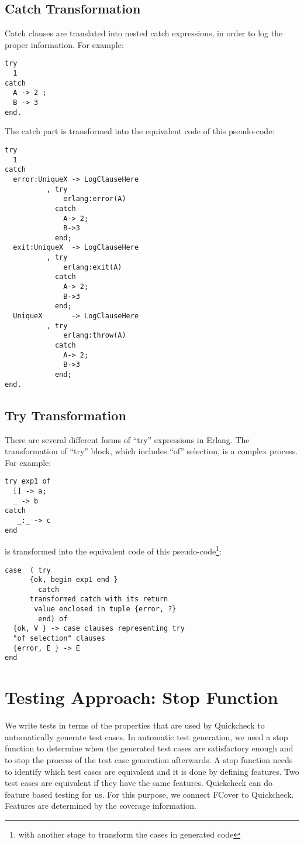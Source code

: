 \documentclass[12pt,a4paper]{report}
\begin{document}
\subsection{Catch Transformation}

Catch clauses are translated into nested catch expressions, in order to log the proper information. For example:

\begin{lstlisting}
try 
  1 
catch 
  A -> 2 ;
  B -> 3
end.
\end{lstlisting}

The catch part is transformed into the equivalent code of this pseudo-code:

\begin{lstlisting}
try 
  1 
catch
  error:UniqueX -> LogClauseHere
		  , try 
		      erlang:error(A) 
		    catch 
		      A-> 2;
		      B->3 
		    end;
  exit:UniqueX  -> LogClauseHere
		  , try
		      erlang:exit(A) 
		    catch 
		      A-> 2;
		      B->3 
		    end;
  UniqueX       -> LogClauseHere
		  , try 
		      erlang:throw(A) 
		    catch
		      A-> 2;
		      B->3
		    end;
end.
\end{lstlisting}

\subsection{Try Transformation}
There are several different forms of ``try'' expressions in Erlang. The transformation of ``try'' block, which includes ``of'' selection, is a complex process. For example:
\begin{lstlisting}
try exp1 of 
  [] -> a;
  _ -> b
catch
   _:_ -> c
end
\end{lstlisting}

is transformed into the equivalent code of this pseudo-code\footnote{with another stage to transform the cases in generated code}:

\begin{lstlisting}
case  ( try
	  {ok, begin exp1 end }
        catch        
	  transformed catch with its return
	   value enclosed in tuple {error, ?}
        end) of
  {ok, V } -> case clauses representing try
  "of selection" clauses
  {error, E } -> E
end
\end{lstlisting}

\section{Testing Approach: Stop Function}
We write tests in terms of the properties that are used by Quickcheck\cite{claessen2000quickcheck} to automatically generate test cases. In automatic test generation, we need a stop function to determine when the generated test cases are satisfactory enough and to stop the process of the test case generation afterwards. A stop function needs to identify which test cases are equivalent and it is done by defining features. Two test cases are equivalent if they have the same features. Quickcheck can do feature based testing for us. For this purpose, we connect FCover to Quickcheck. Features are determined by the coverage information.
\end{document}
